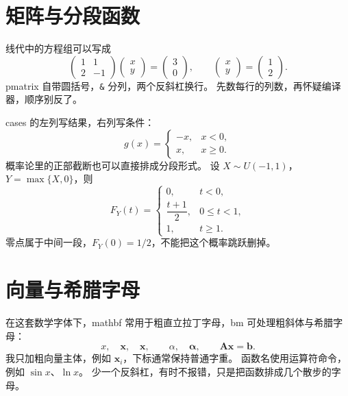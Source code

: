 \section{矩阵与分段函数}
线代中的方程组可以写成
\[
  \begin{pmatrix}1&1\\2&-1\end{pmatrix}
  \begin{pmatrix}x\\y\end{pmatrix}
  =\begin{pmatrix}3\\0\end{pmatrix},\qquad
  \begin{pmatrix}x\\y\end{pmatrix}=\begin{pmatrix}1\\2\end{pmatrix}.
\]
pmatrix 自带圆括号，\verb|&| 分列，两个反斜杠换行。
先数每行的列数，再怀疑编译器，顺序别反了。

cases 的左列写结果，右列写条件：
\[
  g(x)=\begin{cases}-x,&x<0,\\x,&x\geq0.\end{cases}
\]
概率论里的正部截断也可以直接排成分段形式。
设 \(X\sim U(-1,1)\)，\(Y=\max\{X,0\}\)，则
\[
  F_Y(t)=\begin{cases}
    0,&t<0,\\[3pt]
    \dfrac{t+1}{2},&0\leq t<1,\\[3pt]
    1,&t\geq1.
  \end{cases}
\]
零点属于中间一段，\(F_Y(0)=1/2\)，不能把这个概率跳跃删掉。

\section{向量与希腊字母}
在这套数学字体下，mathbf 常用于粗直立拉丁字母，bm 可处理粗斜体与希腊字母：
\[
  x,\quad\mathbf{x},\quad\bm{x},\qquad
  \alpha,\quad\bm{\alpha},\qquad\mathbf{A}\bm{x}=\bm{b}.
\]
我只加粗向量主体，例如 \(\bm{x}_i\)，下标通常保持普通字重。
函数名使用运算符命令，例如 \(\sin x\)、\(\ln x\)。
少一个反斜杠，有时不报错，只是把函数排成几个散步的字母。

